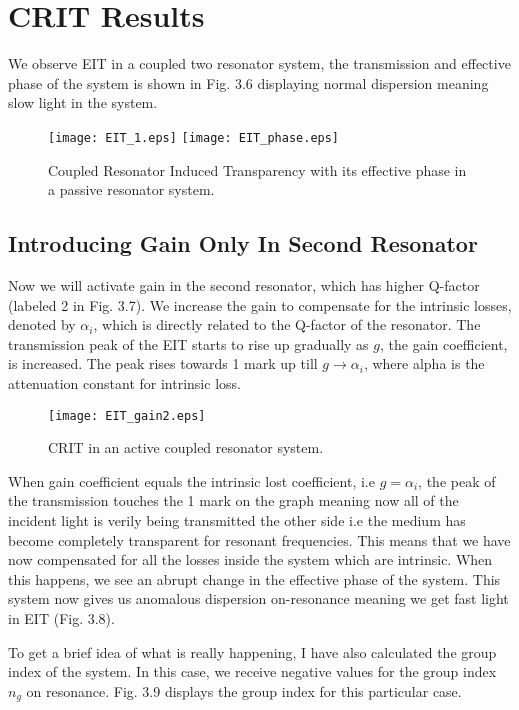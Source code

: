 \section{CRIT Results}
We observe EIT in a coupled two resonator system, the transmission and effective phase of the system is shown in Fig. 3.6 displaying normal dispersion meaning slow light in the system.

\begin{figure}[h]
\texttt{[image: EIT\_1.eps]}
\texttt{[image: EIT\_phase.eps]}
\caption{Coupled Resonator Induced Transparency with its effective phase in a passive resonator system.}
\end{figure}

\subsection{Introducing Gain Only In Second Resonator}
Now we will activate gain in the second resonator, which has higher Q-factor (labeled 2 in Fig. 3.7). We increase the gain to compensate for the intrinsic losses, denoted by $\alpha_{i}$, which is directly related to the Q-factor of the resonator. The transmission peak of the EIT starts to rise up gradually as $g$, the gain coefficient, is increased. The peak rises towards 1 mark up till $g \to \alpha_{i}$, where alpha is the attenuation constant for intrinsic loss. 

\begin{figure}[h]
\centering
\texttt{[image: EIT\_gain2.eps]}
\caption{CRIT in an active coupled resonator system.}
\end{figure}

When gain coefficient equals the intrinsic lost coefficient, i.e $g = \alpha_{i}$, the peak of the transmission touches the 1 mark on the graph meaning now all of the incident light is verily being transmitted the other side i.e the medium has become completely transparent for resonant frequencies. This means that we have now compensated for all the losses inside the system which are intrinsic. When this happens, we see an abrupt change in the effective phase of the system. This system now gives us anomalous dispersion on-resonance meaning we get fast light in EIT (Fig. 3.8). 

To get a brief idea of what is really happening, I have also calculated the group index of the system. In this case, we receive negative values for the group index $n_{g}$ on resonance. Fig. 3.9 displays the group index for this particular case.


